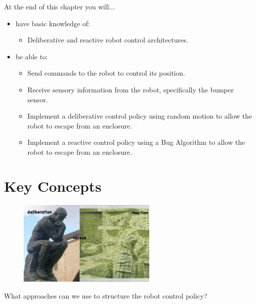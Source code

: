 \noindent At the end of this chapter you will...
\begin{itemize}
\item have basic knowledge of:

\begin{itemize}
\item Deliberative and reactive robot control architectures.
\end{itemize}

\item be able to:

\begin{itemize}
\item Send commands to the robot to control its position.
\item Receive sensory information from the robot, specifically the bumper sensor.
\item Implement a deliberative control policy using random motion to allow the robot to escape from an enclosure.
\item Implement a reactive control policy using a Bug Algorithm to allow the robot to escape from an enclosure.
\end{itemize}

\end{itemize}

\section{Key Concepts}

\begin{figure}[!h]
\centering
\includegraphics[width=0.6\textwidth]{figures/5_spectrum2.jpg}
\end{figure}


What approaches can we use to structure the robot control policy?\\

